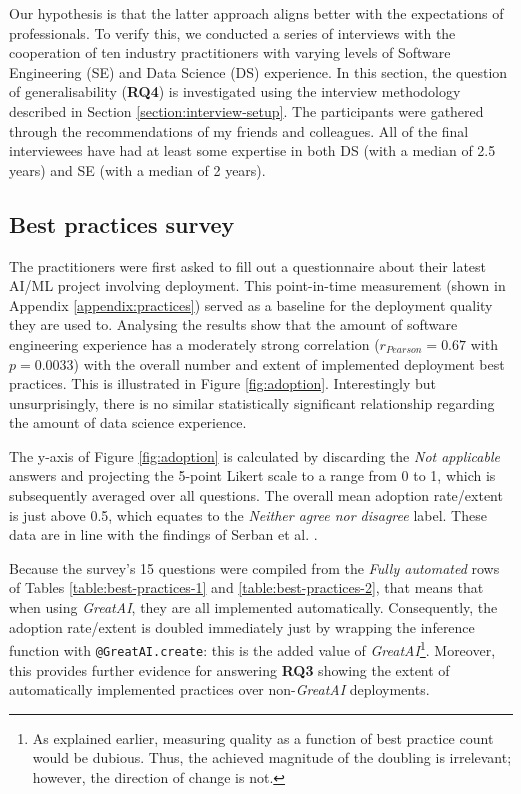 Our hypothesis is that the latter approach aligns better with the expectations of professionals. To verify this, we conducted a series of interviews with the cooperation of ten industry practitioners with varying levels of Software Engineering (SE) and Data Science (DS) experience. In this section, the question of generalisability (\textbf{RQ4}) is investigated using the interview methodology described in Section \ref{section:interview-setup}. The participants were gathered through the recommendations of my friends and colleagues. All of the final interviewees have had at least some expertise in both DS (with a median of 2.5 years) and SE (with a median of 2 years).

\subsection{Best practices survey} \label{subsection:best-practices-survey-results}

The practitioners were first asked to fill out a questionnaire about their latest AI/ML project involving deployment. This point-in-time measurement (shown in Appendix \ref{appendix:practices}) served as a baseline for the deployment quality they are used to. Analysing the results show that the amount of software engineering experience has a moderately strong correlation ($r_{Pearson} = 0.67$ with $p = 0.0033$) with the overall number and extent of implemented deployment best practices. This is illustrated in Figure \ref{fig:adoption}. Interestingly but unsurprisingly, there is no similar statistically significant relationship regarding the amount of data science experience. 

The y-axis of Figure \ref{fig:adoption} is calculated by discarding the \textit{Not applicable} answers and projecting the 5-point Likert scale to a range from 0 to 1, which is subsequently averaged over all questions. The overall mean adoption rate/extent is just above 0.5, which equates to the \textit{Neither agree nor disagree} label. These data are in line with the findings of Serban et al. \cite{serban2020adoption}.

Because the survey's 15 questions were compiled from the \textit{Fully automated} rows of Tables \ref{table:best-practices-1} and \ref{table:best-practices-2}, that means that when using \textit{GreatAI}, they are all implemented automatically. Consequently, the adoption rate/extent is doubled immediately just by wrapping the inference function with \texttt{@GreatAI.create}: this is the added value of \textit{GreatAI}\footnote{As explained earlier, measuring quality as a function of best practice count would be dubious. Thus, the achieved magnitude of the doubling is irrelevant; however, the direction of change is not.}. Moreover, this provides further evidence for answering \textbf{RQ3} showing the extent of automatically implemented practices over non-\textit{GreatAI} deployments.


